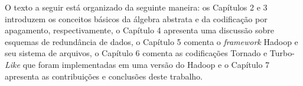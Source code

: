 O texto a seguir está organizado da seguinte maneira: os Capítulos 2 e 3
introduzem os conceitos básicos da álgebra abstrata e da codificação por apagamento, respectivamente, o Capítulo 4 apresenta uma discussão sobre esquemas de redundância de dados, o Capítulo 5 comenta o \emph{framework} Hadoop e seu sistema de arquivos, o Capítulo 6 comenta as codificações Tornado e Turbo-\emph{Like} que foram implementadas em uma versão do Hadoop e o Capítulo 7 apresenta as contribuições e conclusões deste trabalho.

